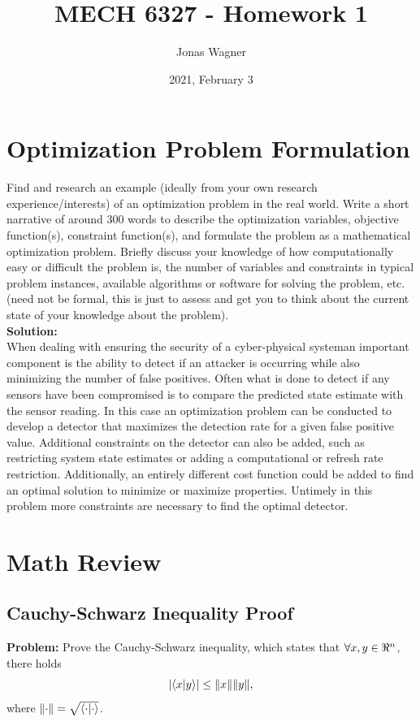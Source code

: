 \documentclass[letter]{article}
\title{MECH 6327 - Homework 1}
\author{Jonas Wagner}
\date{2021, February 3}
\newcommand{\CPS}{cyber-physical system}
\begin{document}
\maketitle

\section{Optimization Problem Formulation}
Find and research an example (ideally from your own research experience/interests) of an optimization problem in the real world. Write a short narrative of around 300 words to describe the
optimization variables, objective function(s), constraint function(s), and formulate the problem as
a mathematical optimization problem. Briefly discuss your knowledge of how computationally easy
or difficult the problem is, the number of variables and constraints in typical problem instances,
available algorithms or software for solving the problem, etc. (need not be formal, this is just to
assess and get you to think about the current state of your knowledge about the problem).\\

\noindent
\textbf{Solution:}\\
When dealing with ensuring the security of a \CPS an important component is the ability to detect if an attacker is occurring while also minimizing the number of false positives. Often what is done to detect if any sensors have been compromised is to compare the predicted state estimate with the sensor reading. In this case an optimization problem can be conducted to develop a detector that maximizes the detection rate for a given false positive value. Additional constraints on the detector can also be added, such as restricting system state estimates or adding a computational or refresh rate restriction. Additionally, an entirely different cost function could be added to find an optimal solution to minimize or maximize properties. Untimely in this problem more constraints are necessary to find the optimal detector. \cite{BELABBAS2019387}\\

\newpage
\section{Math Review}

\subsection{Cauchy-Schwarz Inequality Proof}
\textbf{Problem:}
Prove the Cauchy-Schwarz inequality, which states that $\forall x,y\in \real^n$, there holds
\begin{displaymath}
	\abs{\ip{x}{y}} \leq \norm{x}\norm{y},
\end{displaymath}
where $\norm{\cdot} = \sqrt{\ip{\cdot}{\cdot}}$.\\
\end{document}
